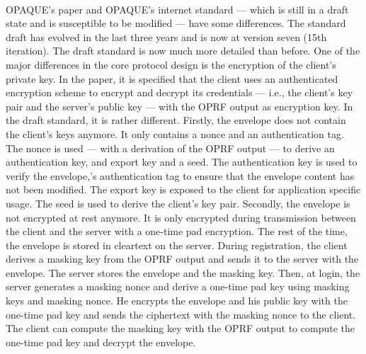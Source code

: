 ﻿\documentclass[../report.tex]{subfiles}
\begin{document}
\paragraph{} \label{sec:opaque_paper_vs_draft}
OPAQUE's paper \cite{OPAQUE_Paper} and OPAQUE's internet standard \cite{OPAQUE_Standard_Draft} --- which is still in a draft state and is susceptible to be modified --- have some differences. The standard draft has evolved in the last three years and is now at version seven (15th iteration).
The draft standard is now much more detailed than before.
One of the major differences in the core protocol design is the encryption of the client's private key.
In the paper, it is specified that the client uses an authenticated encryption scheme to encrypt and decrypt its credentials --- i.e., the client's key pair and the server's public key --- with the OPRF output as encryption key.
%
In the draft standard, it is rather different.
Firstly, the envelope does not contain the client's keys anymore. It only contains a nonce and an authentication tag. 
The nonce is used --- with a derivation of the OPRF output --- to derive an authentication key, and export key and a seed.
The authentication key is used to verify the envelope,'s authentication tag to ensure that the envelope content has not been modified.
The export key is exposed to the client for application specific usage.
The seed is used to derive the client's key pair.
Secondly, the envelope is not encrypted at rest anymore. It is only encrypted during transmission between the client and the server with a one-time pad encryption. The rest of the time, the envelope is stored in cleartext on the server.
During registration, the client derives a masking key from the OPRF output and sends it to the server with the envelope. The server stores the envelope and the masking key.
Then, at login, the server generates a masking nonce and derive a one-time pad key using masking keys and masking nonce. He encrypts the envelope and his public key with the one-time pad key and sends the ciphertext with the masking nonce to the client.
The client can compute the masking key with the OPRF output to compute the one-time pad key and decrypt the envelope.




\subsection{}
\end{document}
